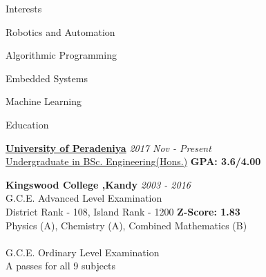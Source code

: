 \documentclass{resume} %
\begin{document}

\begin{rSection}{Interests}
\begin{rSubsection}{}{}{}{}
\item Robotics and Automation
\item Algorithmic Programming 
\item Embedded Systems
\item Machine Learning
\end{rSubsection}


\end{rSection}


\begin{rSection}{Education}

{\bf \href{http://eng.pdn.ac.lk}{University of Peradeniya}} \hfill {\em 2017 Nov - Present} 
\\ \href{http://eng.pdn.ac.lk/deee/academic/undergraduate.php}{Undergraduate in BSc. Engineering(Hons.)} \hfill {\bf  GPA: 3.6/4.00}

{\bf{Kingswood College ,Kandy}} \hfill {\em 2003 - 2016} 
\\ G.C.E. Advanced Level Examination
\\ District Rank - 108, Island Rank - 1200 \hfill {\bf  Z-Score: 1.83}
\\ Physics (A), Chemistry (A), Combined Mathematics (B)
\\
\\ G.C.E. Ordinary Level Examination
\\ A passes for all 9 subjects

\end{rSection}



\end{document}
